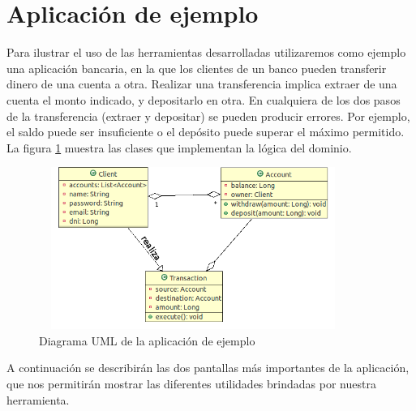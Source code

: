 \section{Aplicación de ejemplo}
\label{Example}
Para ilustrar el uso de las herramientas desarrolladas utilizaremos como ejemplo
una aplicación bancaria, en la que los clientes de un banco pueden transferir
dinero de una cuenta a otra. 
Realizar una transferencia implica extraer de una cuenta el
monto indicado, y depositarlo en otra. 
En cualquiera de los dos pasos de la transferencia (extraer y depositar) se
pueden producir errores.
Por ejemplo, el saldo puede ser insuficiente o el depósito puede superar el
máximo permitido.
La figura \ref{example} muestra las clases que implementan la lógica del
dominio.

	\begin{figure}[h!]
		\centering
		\includegraphics[width=380px, height=200px]{img/transaccion}
		\caption{Diagrama UML de la aplicación de ejemplo}
		\label{example}
	\end{figure}	

A continuación se describirán las dos pantallas más importantes de la
aplicación, que nos permitirán mostrar las diferentes utilidades brindadas por
nuestra herramienta.
 
